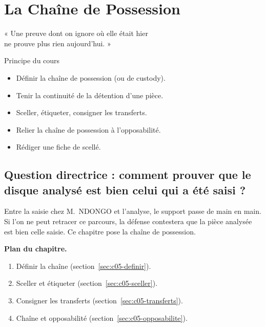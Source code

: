 
\chapter{La Chaîne de Possession}
\label{chap:custody}

\epigraph{%
    « Une preuve dont on ignore où elle était hier\\
    ne prouve plus rien aujourd'hui. »%
}{Principe du cours}


\begin{boxobjectifs}
\begin{itemize}
    \item Définir la chaîne de possession (ou de custody).
    \item Tenir la continuité de la détention d'une pièce.
    \item Sceller, étiqueter, consigner les transferts.
    \item Relier la chaîne de possession à l'opposabilité.
    \item Rédiger une fiche de scellé.
\end{itemize}
\end{boxobjectifs}

\bigskip

\section*{Question directrice : comment prouver que le disque analysé est bien celui qui a été saisi ?}

Entre la saisie chez M.~NDONGO et l'analyse, le support passe de main en
main. Si l'on ne peut retracer ce parcours, la défense contestera que la
pièce analysée est bien celle saisie. Ce chapitre pose la chaîne de
possession.

\medskip
\textbf{Plan du chapitre.}
\begin{enumerate}
    \item Définir la chaîne (section~\ref{sec:c05-definir}).
    \item Sceller et étiqueter (section~\ref{sec:c05-sceller}).
    \item Consigner les transferts (section~\ref{sec:c05-transferts}).
    \item Chaîne et opposabilité (section~\ref{sec:c05-opposabilite}).
\end{enumerate}

